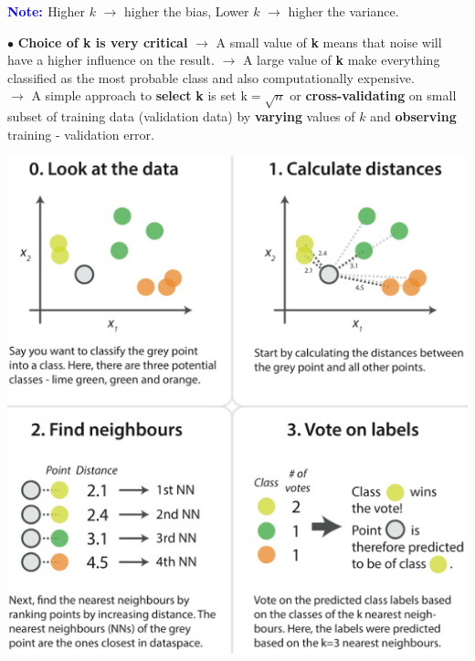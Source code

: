 \documentclass[letterpaper, 10.5pt,landscape]{article}
\begin{document}
\begin{multicols*}{3}
\textbf{\textcolor{blue}{Note: }} Higher $k$ $\rightarrow$ higher the bias, Lower $k$ $\rightarrow$ higher the variance.

$\bullet$ \textbf{Choice of \textbf{k} is very critical} $\rightarrow$ A small value of \textbf{k} means that noise will have a higher influence on the result. 
$\rightarrow$ A large value of \textbf{k} make everything classified as the most probable class and also computationally expensive.\\

$\rightarrow$ A simple approach to \textbf{select} \textbf{k} is set $\boxed{\text{k} = \sqrt{n}}$ or \textbf{cross-validating} on small subset of training data (validation data) by \textbf{varying} values of $k$ and \textbf{observing} training - validation error. \\


\begin{center}
    \begin{minipage}{\linewidth}
    \includegraphics[width=\textwidth]{figures/knn_steps.PNG}
    \end{minipage}
\end{center}







\end{multicols*}
\end{document}
